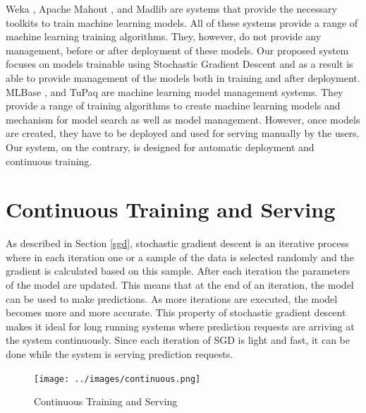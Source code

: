 \documentclass{sig-alternate-05-2015}
\begin{document}
Weka \cite{hall2009weka}, Apache Mahout \cite{Owen:2011:MA:2132656}, and Madlib \cite{hellerstein2012madlib} are systems that provide the necessary toolkits to train machine learning models. All of these systems provide a range of machine learning training algorithms. 
They, however, do not provide any management, before or after deployment of these models. 
Our proposed system focuses on models trainable using Stochastic Gradient Descent and as a result is able to provide management of the models both in training and after deployment.
MLBase \cite{kraska2013mlbase}, and TuPaq \cite{sparks2015tupaq} are machine learning model management systems.
They provide a range of training algorithms to create machine learning models and mechanism for model search as well as model management.
However, once models are created, they have to be deployed and used for serving manually by the users.
Our system, on the contrary, is designed for automatic deployment and continuous training.

\section{Continuous Training and Serving} \label{continious-training-serving}
As described in Section \ref{sgd}, stochastic gradient descent is an iterative process where in each iteration one or a sample of the data is selected randomly and the gradient is calculated based on this sample. 
After each iteration the parameters of the model are updated.
This means that at the end of an iteration, the model can be used to make predictions.
As more iterations are executed, the model becomes more and more accurate.
This property of stochastic gradient descent makes it ideal for long running systems where prediction requests are arriving at the system continuously.
Since each iteration of SGD is light and fast, it can be done while the system is serving prediction requests.
\begin{figure}[t]
\centering
\texttt{[image: ../images/continuous.png]}
\caption{Continuous Training and Serving}
\label{fig:cont-training-serving}
\end{figure}
\end{document}

